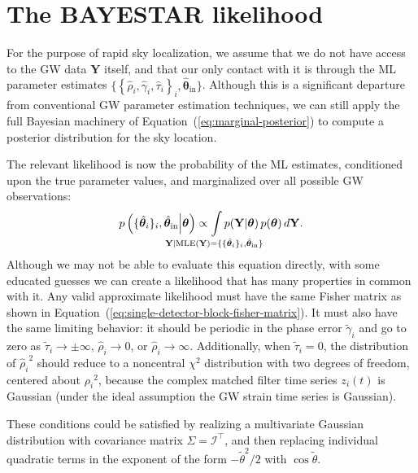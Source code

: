 \documentclass[amsmath,amssymb,aps,prx,reprint,nopreprintnumbers,nofootinbib]{revtex4-1}
\def\clap#1{\hbox to 0pt{\hss#1\hss}}
\def\mathclap{\mathpalette\mathclapinternal}
\def\mathclapinternal#1#2{\clap{$\mathsurround=0pt#1{#2}$}}
\begin{document}
\section{The \acs{BAYESTAR} likelihood}
\label{sec:bayestar-likelihood}

For the purpose of rapid sky localization, we assume that we do not have access to the \ac{GW} data $\mathbf{Y}$ itself, and that our only contact with it is through the \ac{ML} parameter estimates $\{\left\{ \hat\rho_i, \hat\gamma_i, \hat\tau_i \right\}_i, \hat{\bm\theta}_\mathrm{in}\}$. Although this is a significant departure from conventional \ac{GW} parameter estimation techniques, we can still apply the full Bayesian machinery of Equation~(\ref{eq:marginal-posterior}) to compute a posterior distribution for the sky location.

The relevant likelihood is now the probability of the \ac{ML} estimates, conditioned upon the true parameter values, and marginalized over all possible \ac{GW} observations:
%
\begin{equation}\label{eq:detection-candidate-likelihood}
    p\left(\{\hat{\bm\theta}_i\}_i,
        \hat{\bm\theta}_\mathrm{in}
    \middle| \bm\theta\right)
    \propto \int\limits_{\mathclap{\mathbf{Y} | \mathrm{MLE}(\mathbf{Y}) =
        \{\{\hat{\bm\theta}_i\}_i,
        \hat{\bm\theta}_\mathrm{in}\}}}
    p(\mathbf{Y} | \bm\theta) \, p(\bm\theta)
    \, d\mathbf{Y}.
\end{equation}
%
Although we may not be able to evaluate this equation directly, with some educated guesses we can create a likelihood that has many properties in common with it. Any valid approximate likelihood must have the same Fisher matrix as shown in Equation~(\ref{eq:single-detector-block-fisher-matrix}). It must also have the same limiting behavior: it should be periodic in the phase error $\tilde{\gamma}_i$ and go to zero as $\tilde{\tau}_i \rightarrow \pm \infty$, $\hat{\rho}_i \rightarrow 0$, or $\hat{\rho}_i \rightarrow \infty$. Additionally, when $\tilde{\tau}_i = 0$, the distribution of ${\hat{\rho}_i}^2$ should reduce to a noncentral $\chi^2$ distribution with two degrees of freedom, centered about ${\rho_i}^2$, because the complex matched filter time series $z_i(t)$ is Gaussian (under the ideal assumption the \ac{GW} strain time series is Gaussian).

These conditions could be satisfied by realizing a multivariate Gaussian distribution with covariance matrix $\Sigma = \mathcal{I}^\intercal$, and then replacing individual quadratic terms in the exponent of the form $-\tilde{\theta}^2/2$ with $\cos{\tilde{\theta}}$.
\end{document}
